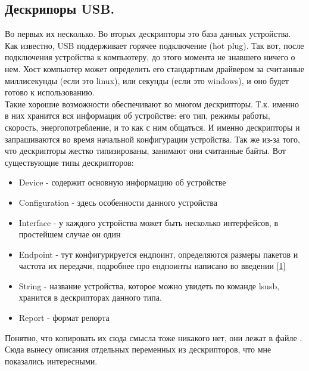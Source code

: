 \documentclass[12pt,a4paper]{article}
\begin{document}
\subsection{Дескрипоры USB.}\label{158500}
    Во первых их несколько. Во вторых дескрипторы это база данных устройства.
    Как известно,
    USB поддерживает горячее подключение (hot plug). Так вот, после подключения
    устройства к компьютеру, до этого момента не знавшего ничего о нем. Хост
    компьютер может определить его стандартным драйвером за считанные
    миллисекунды (если это linux), или секунды
    (если это windows), и оно будет готово к использованию.\\
    Такие хорошие возможности обеспечивают во многом дескрипторы. Т.к. именно
    в них хранится вся информация об устройстве: его тип, режимы работы,
    скорость, энергопотребление, и то как с ним общаться. И именно дескрипторы
    и запрашиваются во время начальной конфигурации устройства. Так же из-за
    того, что дескрипторы жестко типизированы, занимают они считанные байты.
    Вот существующие типы дескрипторов:
\begin{itemize}
    \item Device - содержит основную информацию об устройстве
    \item Configuration - здесь особенности данного устройства
    \item Interface - у каждого устройства может быть несколько интерфейсов,
    в простейшем случае он один
    \item Endpoint - тут конфигурируется ендпоинт,
    определяются размеры пакетов и частота их передачи, подробнее про ендпоинты
    написано во введении \ref{1}
    \item String - название устройства, которое можно увидеть по команде lsusb,
    хранится в дескрипторах данного типа.
    \item Report - формат репорта
\end{itemize}
    Понятно, что копировать их сюда смысла тоже никакого нет, они лежат в файле
    . Сюда вынесу описания отдельных переменных из
    дескрипторов, что мне показались интересными.
\end{document}
